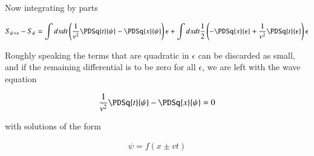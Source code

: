 Now integrating by parts

\begin{align*}
S_{\psi + \epsilon} - S_\psi
&=
\int dx dt \left( \inv{v^2} \PDSq{t}{\psi} -\PDSq{x}{\psi} \right) {\epsilon} 
+ \int dx dt \inv{2} \left( -\PDSq{x}{\epsilon } + \inv{v^2} \PDSq{t}{\epsilon } \right) \epsilon \\
\end{align*}

Roughly speaking the terms that are quadratic in $\epsilon$ can be discarded as small, and if the remaining differential
is to be zero for all $\epsilon$, we are left with the wave equation

\begin{align*}
\inv{v^2} \PDSq{t}{\psi} -\PDSq{x}{\psi} = 0 
\end{align*}

with solutions 
of the form 

\begin{align*}
\psi = f(x \pm vt)
\end{align*}

%
%

%
